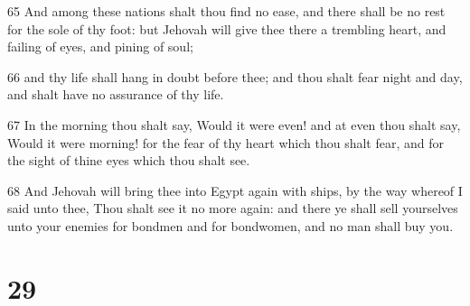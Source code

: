 \par 65 And among these nations shalt thou find no ease, and there shall be no rest for the sole of thy foot: but Jehovah will give thee there a trembling heart, and failing of eyes, and pining of soul;
\par 66 and thy life shall hang in doubt before thee; and thou shalt fear night and day, and shalt have no assurance of thy life.
\par 67 In the morning thou shalt say, Would it were even! and at even thou shalt say, Would it were morning! for the fear of thy heart which thou shalt fear, and for the sight of thine eyes which thou shalt see.
\par 68 And Jehovah will bring thee into Egypt again with ships, by the way whereof I said unto thee, Thou shalt see it no more again: and there ye shall sell yourselves unto your enemies for bondmen and for bondwomen, and no man shall buy you.

\chapter{29}

